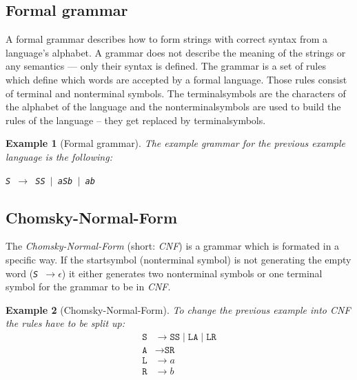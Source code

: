\documentclass[a4paper, 11pt]{article}
\newtheorem*{example*}{Example}
\begin{document}

\subsection{Formal grammar}
\label{formalgrammar}
A formal grammar describes how to form strings with correct syntax from a language's alphabet. A grammar does not describe the meaning of the strings or any semantics — only their syntax is defined. The grammar is a set of rules which define which words are accepted by a formal language. Those rules consist of terminal and nonterminal symbols. The terminalsymbols are the characters of the alphabet of the language and the nonterminalsymbols are used to build the rules of the language -- they get replaced by terminalsymbols. \cite{CNF, language} 

\begin{example*}[Formal grammar]
The example grammar for the previous example language is the following:
\begin{center}
\texttt{S $\rightarrow$ SS $\mid$  aSb $\mid$ ab}
\end{center}
\end{example*}


\subsection{Chomsky-Normal-Form}
\label{cnf}
The \textit{Chomsky-Normal-Form} (short: \textit{CNF}) is a grammar which is formated in a specific way. If the startsymbol (nonterminal symbol) is not generating the empty word (\textit{\texttt{S $\rightarrow \epsilon$}}) it either generates two nonterminal symbols or one terminal symbol for the grammar to be in \textit{CNF}.
\cite{CNF}

\begin{example*}[Chomsky-Normal-Form]
To change the previous example into CNF the rules have to be split up:
\begin{align*}
\texttt{S} & \rightarrow \texttt{SS} \mid  \texttt{LA} \mid \texttt{LR} \\
\texttt{A} & \rightarrow \texttt{SR} \\
\texttt{L} & \rightarrow a \\
\texttt{R} & \rightarrow b
\end{align*}
\end{example*}
\end{document}
